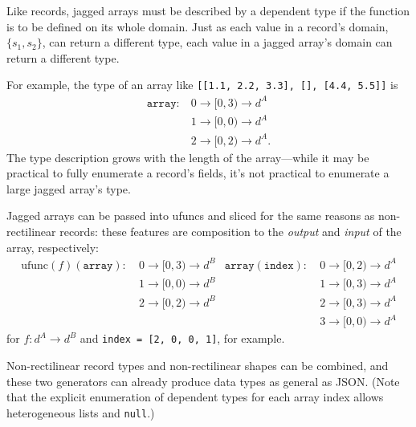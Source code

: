 \documentclass[12pt]{article}
\begin{document}
Like records, jagged arrays must be described by a dependent type if the function is to be defined on its whole domain. Just as each value in a record's domain, $\{s_1, s_2\}$, can return a different type, each value in a jagged array's domain can return a different type.

For example, the type of an array like \texttt{[[1.1, 2.2, 3.3], [], [4.4, 5.5]]} is
\begin{align*}
\texttt{array}: &\ 0 \to [0, 3) \to d^A \\
 &\ 1 \to [0, 0) \to d^A \\
 &\ 2 \to [0, 2) \to d^A\mbox{.}
\end{align*}
\noindent The type description grows with the length of the array---while it may be practical to fully enumerate a record's fields, it's not practical to enumerate a large jagged array's type.

Jagged arrays can be passed into ufuncs and sliced for the same reasons as non-rectilinear records: these features are composition to the {\it output} and {\it input} of the array, respectively:
\begin{align*}
\mbox{ufunc}(f)(\texttt{array}): &\ 0 \to [0, 3) \to d^B & \texttt{array}(\texttt{index}): &\ 0 \to [0, 2) \to d^A \\
 &\ 1 \to [0, 0) \to d^B                                             & &\ 1 \to [0, 3) \to d^A \\
 &\ 2 \to [0, 2) \to d^B                                             & &\ 2 \to [0, 3) \to d^A \\
 &                                                                   & &\ 3 \to [0, 0) \to d^A
\end{align*}
\noindent for $f: d^A \to d^B$ and \texttt{index = [2, 0, 0, 1]}, for example.

Non-rectilinear record types and non-rectilinear shapes can be combined, and these two generators can already produce data types as general as JSON. (Note that the explicit enumeration of dependent types for each array index allows heterogeneous lists and \texttt{null}.)
\end{document}
